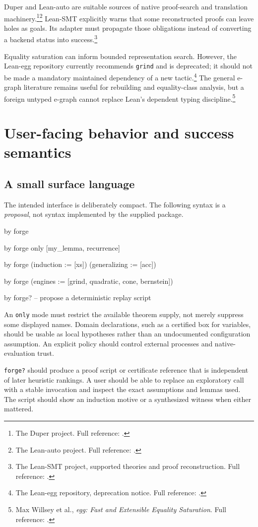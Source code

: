 \documentclass[11pt,letterpaper]{article}
\newcommand{\Lean}{\textsf{Lean}}
\newcommand{\grind}{\texttt{grind}}
\newcommand{\src}[2]{\footnote{#2. Full reference: \cite{#1}.}}
\theoremstyle{definition}
\theoremstyle{remark}
\begin{document}
Duper and Lean-auto are suitable sources of native proof-search and translation machinery.\src{duper}{The Duper project}\src{leanauto}{The Lean-auto project} Lean-SMT explicitly warns that some reconstructed proofs can leave holes as goals. Its adapter must propagate those obligations instead of converting a backend status into success.\src{leansmt}{The Lean-SMT project, supported theories and proof reconstruction}

Equality saturation can inform bounded representation search. However, the Lean-egg repository currently recommends \grind{} and is deprecated; it should not be made a mandatory maintained dependency of a new tactic.\src{leanegg}{The Lean-egg repository, deprecation notice} The general e-graph literature remains useful for rebuilding and equality-class analysis, but a foreign untyped e-graph cannot replace \Lean's dependent typing discipline.\src{egg}{Max Willsey et al., \emph{egg: Fast and Extensible Equality Saturation}}

\section{User-facing behavior and success semantics}
\subsection{A small surface language}
The intended interface is deliberately compact. The following syntax is a \emph{proposal}, not syntax implemented by the supplied package.
\begin{code}
by
  forge

by
  forge only [my_lemma, recurrence]

by
  forge (induction := [xs]) (generalizing := [acc])

by
  forge (engines := [grind, quadratic, cone, bernstein])

by
  forge?  -- propose a deterministic replay script
\end{code}
An \texttt{only} mode must restrict the available theorem supply, not merely suppress some displayed names. Domain declarations, such as a certified box for variables, should be usable as local hypotheses rather than an undocumented configuration assumption. An explicit policy should control external processes and native-evaluation trust.

\texttt{forge?} should produce a proof script or certificate reference that is independent of later heuristic rankings. A user should be able to replace an exploratory call with a stable invocation and inspect the exact assumptions and lemmas used. The script should show an induction motive or a synthesized witness when either mattered.
\end{document}
